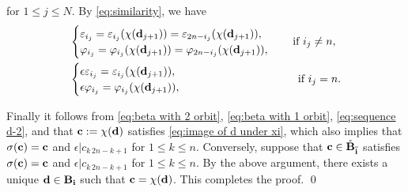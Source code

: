 \documentclass[leqno,11pt]{amsart}
\numberwithin{equation}{section}
\newcommand{\bs}{\boldsymbol}
\newcommand{\B}{\mathbf{B}}
\newcommand{\ov}{\overline}
\newcommand{\bi}{\bs{\rm i}}
\begin{document}
for $1\leq j\leq N$.
By \eqref{eq:similarity}, we have
\begin{equation*}
\begin{split}
&
\begin{cases}
\varepsilon_{i_{j}} 
=\varepsilon_{i_{j}} (\chi({\bf d}_{j+1}))
=\varepsilon_{2n-i_{j}} (\chi({\bf d}_{j+1})), \\
\varphi_{i_{j}}
=\varphi_{i_{j}}(\chi({\bf d}_{j+1}))
=\varphi_{2n-i_{j}}(\chi({\bf d}_{j+1})),
\end{cases}\quad \text{if $i_j\neq n$},\\
&
\begin{cases}
\epsilon\varepsilon_{i_{j}}
=\varepsilon_{i_{j}} (\chi({\bf d}_{j+1})), \\
\epsilon\varphi_{i_{j}} 
=\varphi_{i_{j}}(\chi({\bf d}_{j+1})),
\end{cases}
\hskip 3cm  \quad\text{if $i_j=n$}.
\end{split}
\end{equation*}

Finally it follows from \eqref{eq:beta with 2 orbit}, \eqref{eq:beta with 1 orbit}, \eqref{eq:sequence d-2}, and  \cite[Proposition 3.4.7]{S94} that ${\bf c}:=\chi({\bf d})$ satisfies \eqref{eq:image of d under xi}, which also implies that $\sigma({\bf c})={\bf c}$ and $\epsilon|c_{k\,2n-k+1}$ for $1\leq k\leq n$.  
Conversely, suppose that ${\bf c}\in \mathring{\B}_{\ov{\bi}}$ satisfies 
$\sigma({\bf c})={\bf c}$ and $\epsilon|c_{k\,2n-k+1}$ for $1\leq k\leq n$. 
By the above argument, there exists a unique ${\bf d}\in \B_{\bi}$ such that ${\bf c}=\chi({\bf d})$. This completes the proof.
\qed
\end{document}
